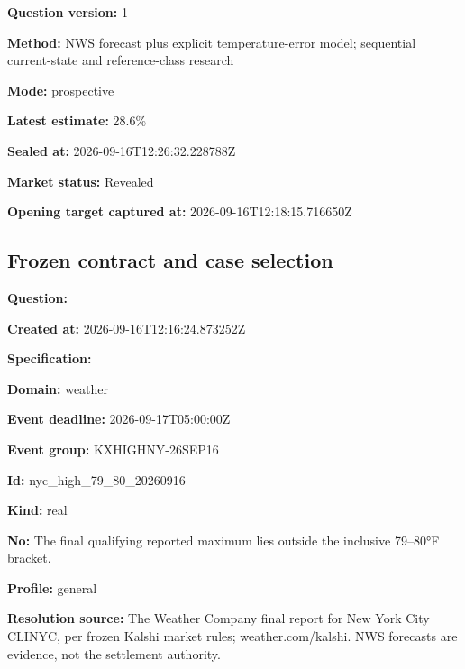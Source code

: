 \documentclass[11pt]{article}
\begin{document}
\par\noindent\textbf{Question version:} 1

\par\noindent\textbf{Method:} NWS forecast plus explicit temperature-error model; sequential current-state and reference-class research

\par\noindent\textbf{Mode:} prospective

\par\noindent\textbf{Latest estimate:} 28.6\%

\par\noindent\textbf{Sealed at:} 2026-09-16T12:26:32.228788Z

\par\noindent\textbf{Market status:} Revealed

\par\noindent\textbf{Opening target captured at:} 2026-09-16T12:18:15.716650Z

\subsection*{\textcolor{epdarkgreen}{Frozen contract and case selection}}
\par\noindent\textbf{Question:} \par \par\noindent\textbf{Created at:} 2026-09-16T12:16:24.873252Z

\par\noindent\textbf{Specification:} \par \par\noindent\textbf{Domain:} weather

\par\noindent\textbf{Event deadline:} 2026-09-17T05:00:00Z

\par\noindent\textbf{Event group:} KXHIGHNY-26SEP16

\par\noindent\textbf{Id:} nyc\_high\_79\_80\_20260916

\par\noindent\textbf{Kind:} real

\par\noindent\textbf{No:} The final qualifying reported maximum lies outside the inclusive 79–80°F bracket.

\par\noindent\textbf{Profile:} general

\par\noindent\textbf{Resolution source:} The Weather Company final report for New York City CLINYC, per frozen Kalshi market rules; weather.com/kalshi. NWS forecasts are evidence, not the settlement authority.
\end{document}
